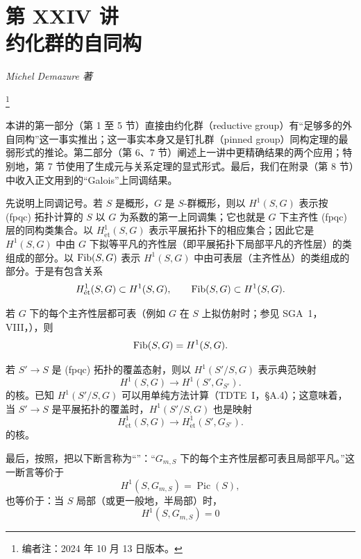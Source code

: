 \setcounter{footnote}{0}
\chapter*{第 XXIV 讲\\约化群的自同构}
\begin{center}
  \textit{Michel Demazure 著}
\end{center}
\begingroup
\renewcommand{\thefootnote}{0}
\footnote{编者注：2024 年 10 月 13 日版本。}
\addtocounter{footnote}{-1}
\endgroup
本讲的第一部分（第 1 至 5 节）直接由约化群（reductive group）有“足够多的外自同构”这一事实推出；这一事实本身又是钉扎群（pinned group）同构定理的最弱形式的推论。第二部分（第 6、7 节）阐述上一讲中更精确结果的两个应用；特别地，第 7 节使用了生成元与关系定理的显式形式。最后，我们在附录（第 8 节）中收入正文用到的“Galois”上同调结果。

先说明上同调记号。若 \(S\) 是概形，\(G\) 是 \(S\)-群概形，则以 \(H^1(S,G)\) 表示按 \textup{(fpqc)} 拓扑计算的 \(S\) 以 \(G\) 为系数的第一上同调集；它也就是 \(G\) 下主齐性 \textup{(fpqc)} 层的同构类集合。以 \(H^1_{\mathrm{\acute et}}(S,G)\) 表示平展拓扑下的相应集合；因此它是 \(H^1(S,G)\) 中由 \(G\) 下拟等平凡的齐性层（即平展拓扑下局部平凡的齐性层）的类组成的部分。以 \(\operatorname{Fib}(S,G)\) 表示 \(H^1(S,G)\) 中由可表层（主齐性丛）的类组成的部分。于是有包含关系
\[
  H^1_{\mathrm{\acute et}}(S,G)\subset H^1(S,G),
  \qquad
  \operatorname{Fib}(S,G)\subset H^1(S,G).
\]

若 \(G\) 下的每个主齐性层都可表（例如 \(G\) 在 \(S\) 上拟仿射时；参见 SGA~1，VIII，），则
\[
  \operatorname{Fib}(S,G)=H^1(S,G).
\]

若 \(S'\to S\) 是 \textup{(fpqc)} 拓扑的覆盖态射，则以 \(H^1(S'/S,G)\) 表示典范映射
\[
  H^1(S,G)\longrightarrow H^1(S',G_{S'}).
\]
的核。已知 \(H^1(S'/S,G)\) 可以用单纯方法计算（TDTE~I，\S A.4）；这意味着，当 \(S'\to S\) 是平展拓扑的覆盖时，\(H^1(S'/S,G)\) 也是映射
\[
  H^1_{\mathrm{\acute et}}(S,G)
  \longrightarrow
  H^1_{\mathrm{\acute et}}(S',G_{S'}).
\]
的核。

最后，按照，把以下断言称为“”：“\(G_{m,S}\) 下的每个主齐性层都可表且局部平凡。”这一断言等价于
\[
  H^1(S,G_{m,S})=\operatorname{Pic}(S),
\]
也等价于：当 \(S\) 局部（或更一般地，半局部）时，
\[
  H^1(S,G_{m,S})=0
\]

